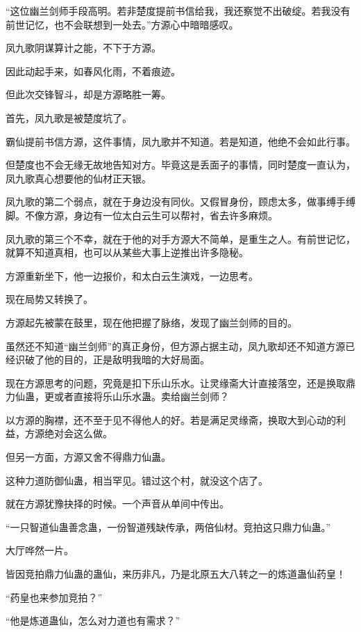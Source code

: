 
\begin{this_body}

“这位幽兰剑师手段高明。若非楚度提前书信给我，我还察觉不出破绽。若我没有前世记忆，也不会联想到一处去。”方源心中暗暗感叹。

凤九歌阴谋算计之能，不下于方源。

因此动起手来，如春风化雨，不着痕迹。

但此次交锋智斗，却是方源略胜一筹。

首先，凤九歌是被楚度坑了。

霸仙提前书信方源，这件事情，凤九歌并不知道。若是知道，他绝不会如此行事。

但楚度也不会无缘无故地告知对方。毕竟这是丢面子的事情，同时楚度一直认为，凤九歌真心想要他的仙材正天银。

凤九歌的第二个弱点，就在于身边没有同伙。又假冒身份，顾虑太多，做事缚手缚脚。不像方源，身边有一位太白云生可以帮衬，省去许多麻烦。

凤九歌的第三个不幸，就在于他的对手方源大不简单，是重生之人。有前世记忆，就算不知道真相，也可以从某些大事上逆推出许多隐秘。

方源重新坐下，他一边报价，和太白云生演戏，一边思考。

现在局势又转换了。

方源起先被蒙在鼓里，现在他把握了脉络，发现了幽兰剑师的目的。

虽然还不知道“幽兰剑师”的真正身份，但方源占据主动，凤九歌却还不知道方源已经识破了他的目的，正是敌明我暗的大好局面。

现在方源思考的问题，究竟是扣下乐山乐水。让灵缘斋大计直接落空，还是换取鼎力仙蛊，更或者直接将乐山乐水蛊。卖给幽兰剑师？

以方源的胸襟，还不至于见不得他人的好。若是满足灵缘斋，换取大到心动的利益，方源绝对会这么做。

但另一方面，方源又舍不得鼎力仙蛊。

这种力道防御仙蛊，相当罕见。错过这个村，就没这个店了。

就在方源犹豫抉择的时候。一个声音从单间中传出。

“一只智道仙蛊善念蛊，一份智道残缺传承，两倍仙材。竞拍这只鼎力仙蛊。”

大厅哗然一片。

皆因竞拍鼎力仙蛊的蛊仙，来历非凡，乃是北原五大八转之一的炼道蛊仙药皇！

“药皇也来参加竞拍？”

“他是炼道蛊仙，怎么对力道也有需求？”


\end{this_body}
